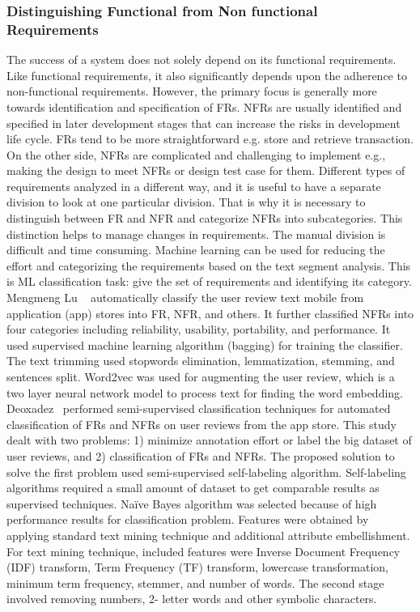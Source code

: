 \subsubsection{Distinguishing Functional from Non functional Requirements}

The success of a system does not solely depend on its functional requirements.
Like functional requirements, it also significantly depends upon the adherence
to non-functional requirements. However, the primary focus is generally more
towards identification and specification of FRs. NFRs are usually identified and
specified in later development stages that can increase the risks in development
life cycle. FRs tend to be more straightforward e.g. store and retrieve
transaction. On the other side, NFRs are complicated and challenging to
implement e.g., making the design to meet NFRs or design test case for them.
Different types of requirements analyzed in a different way, and it is useful to
have a separate division to look at one particular division. That is why it is
necessary to distinguish between FR and NFR and categorize NFRs into
subcategories. This distinction helps to manage changes in requirements. The
manual division is difficult and time consuming. Machine learning can be used
for reducing the effort and categorizing the requirements based on the text
segment analysis. This is ML classification task: give the set of requirements
and identifying its category.\\

Mengmeng Lu \etal~ \cite{Lu:2017} automatically classify the user review text
mobile from application (app) stores  into FR, NFR, and others. It further
classified NFRs into four categories including reliability, usability,
portability, and performance. It used supervised machine learning algorithm
(bagging) for training the classifier. The text trimming used stopwords
elimination, lemmatization, stemming, and sentences split. Word2vec was used for augmenting the user review, 
which is a two layer neural network model to process text for finding the word embedding.\\

Deoxadez \etal~\cite{Deocadez:2017}performed semi-supervised classification techniques
for automated classification of FRs and NFRs on user reviews from the app store.
This study dealt with two problems: 1) minimize annotation effort or label the
big dataset of user reviews, and 2) classification of FRs and NFRs. The proposed
solution to solve the first problem used semi-supervised self-labeling
algorithm. Self-labeling algorithms required a small amount of dataset to get
comparable results as supervised techniques. Naïve Bayes algorithm was selected
because of high performance results for classification problem. Features were
obtained by applying standard text mining technique and additional attribute
embellishment. For text mining technique,
included features were Inverse Document Frequency (IDF) transform, Term Frequency (TF) transform, lowercase
transformation, minimum term frequency, stemmer, and number of words. The second stage involved removing numbers, 2- letter words
and other symbolic characters.\\

